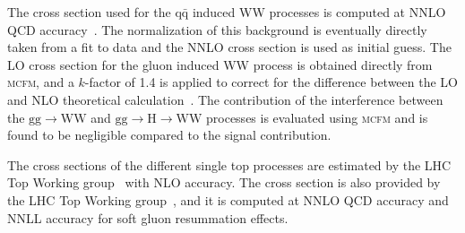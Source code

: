 The cross section used for the $\mathrm{q\bar q}$ induced WW processes is computed at NNLO QCD accuracy~\cite{Gehrmann:2014fva}. The normalization of this background is eventually directly taken from a fit to data and the NNLO cross section is used as initial guess. The LO cross section for the gluon induced WW process is obtained directly from \textsc{mcfm}, and a $k$-factor of 1.4 is applied to correct for the difference between the LO and NLO theoretical calculation~\cite{Caola:2015rqy}.
The contribution of the interference between the $\mathrm{gg \to WW}$ and $\mathrm{gg\to H\to WW}$ processes is evaluated using \textsc{mcfm} and is found to be negligible compared to the signal contribution.

The cross sections of the different single top processes are estimated by the LHC Top Working group~\cite{singletop} with NLO accuracy.
The \ttbar cross section is also provided by the LHC Top Working group~\cite{topxsec}, and it is computed at NNLO QCD accuracy and NNLL accuracy for soft gluon resummation effects.

